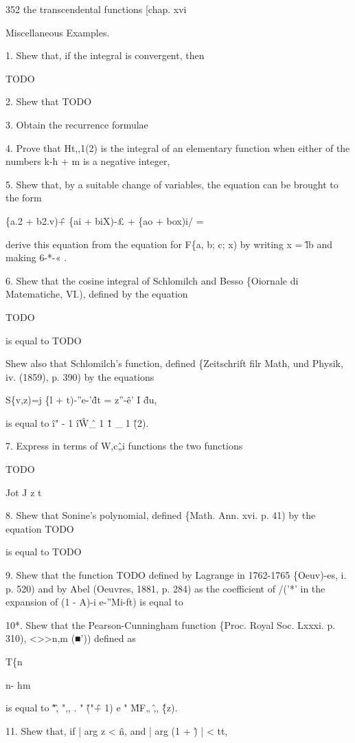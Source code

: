 352 the transcendental functions [chap. xvi

Miscellaneous Examples.

1. Shew that, if the integral is convergent, then

TODO

2. Shew that TODO

3. Obtain the recurrence formulae

4. Prove that Ht,,1(2) is the integral of an elementary function when
either of the numbers k-h + m is a negative integer,

5. Shew that, by a suitable change of variables, the equation can be
brought to the form

\{a.2 + b2.v)\^ + \{ai + biX)-£ + \{ao + box)i/ =

derive this equation from the equation for F\{a, b; c; x) by writing x
= \^lb and making 6-*-« .

6. Shew that the cosine integral of Schlomilch and Besso \{Oiornale di
Matematiche, VI.), defined by the equation

TODO

is equal to TODO

Shew also that Schlomilch's function, defined \{Zeitschrift filr Math,
und Physik, iv. (1859), p. 390) by the equations

S\{v,z)=j \{l + t)-''e-'\^dt = z''-\^e' I \^du,

is equal to \^i" - 1 \^i\^ W\^ \_ 1 \^ 1 \_ 1 \^ (2).

7. Express in terms of W,c\^„i functions the two functions

TODO

Jot J z t

8. Shew that Sonine's polynomial, defined \{Math. Ann. xvi. p. 41) by
the equation TODO

is equal to TODO

%
%

9. Shew that the function TODO defined by Lagrange in 1762-1765
\{Oeuv)-es, i. p. 520) and by Abel (Oeuvres, 1881, p. 284) as the
coefficient of /('*' in the expansion of (1 - A)-i e-''Mi-ft) is eqnal
to

10*. Shew that the Pearson-Cunningham function \{Proc. Royal Soc.
Lxxxi. p. 310), <>>n,m (■')) defined as

T\{n

n- hm

is equal to \^ "\^, ",, . " \^ ("\^ + 1) e " \^MF„ \^,, \^ \{z).

11. Shew that, if | arg z < \^n, and | arg (1 + \^) | < tt,

